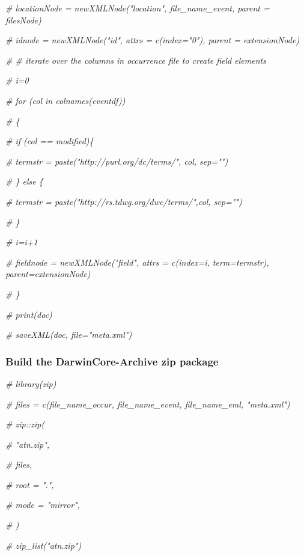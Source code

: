 \documentclass[
]{book}
\newenvironment{Shaded}{\begin{snugshade}}{\end{snugshade}}
\newcommand{\CommentTok}[1]{\textcolor[rgb]{0.56,0.35,0.01}{\textit{#1}}}
\begin{document}
\begin{Shaded}
\begin{Highlighting}[]
\CommentTok{\# locationNode = newXMLNode("location", file\_name\_event, parent = filesNode)}

\CommentTok{\# idnode = newXMLNode("id", attrs = c(index="0"), parent = extensionNode)}


\CommentTok{\# \# iterate over the columns in occurrence file to create field elements}

\CommentTok{\# i=0}

\CommentTok{\# for (col in colnames(eventdf))}

\CommentTok{\#     \{}

\CommentTok{\#     if (col == \textquotesingle{}modified\textquotesingle{})\{}

\CommentTok{\#         termstr = paste("http://purl.org/dc/terms/", col, sep="")}

\CommentTok{\#     \} else \{}

\CommentTok{\#         termstr = paste("http://rs.tdwg.org/dwc/terms/",col, sep="")}

\CommentTok{\#         \}}


\CommentTok{\#     i=i+1}


\CommentTok{\#     fieldnode = newXMLNode("field", attrs = c(index=i, term=termstr), parent=extensionNode)}

\CommentTok{\# \}}



\CommentTok{\# print(doc)}



\CommentTok{\# saveXML(doc, file="meta.xml")}
\end{Highlighting}
\end{Shaded}

\hypertarget{build-the-darwincore-archive-zip-package}{%
\subsubsection{Build the DarwinCore-Archive zip package}\label{build-the-darwincore-archive-zip-package}}

\begin{Shaded}
\begin{Highlighting}[]
\CommentTok{\# library(zip)}


\CommentTok{\# files = c(file\_name\_occur, file\_name\_event, file\_name\_eml, "meta.xml")}

\CommentTok{\# zip::zip(}

\CommentTok{\#     "atn.zip",}

\CommentTok{\#     files,}

\CommentTok{\#     root = ".",}

\CommentTok{\#     mode = "mirror",}

\CommentTok{\# )}


\CommentTok{\# zip\_list("atn.zip")}
\end{Highlighting}
\end{Shaded}
\end{document}
